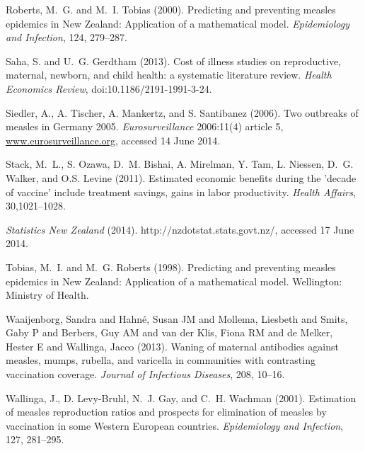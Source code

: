 \documentclass{article}
\begin{document}
\begin{thebibliography}{}
Roberts, M.~G. and M.~I. Tobias (2000).
\newblock Predicting and preventing measles epidemics in New Zealand: Application of a mathematical model. 
\newblock \emph{Epidemiology and Infection}, 124, 279--287.

Saha, S. and U.~G. Gerdtham (2013).
\newblock Cost of illness studies on reproductive, maternal, newborn, and child health: a systematic literature review.
\newblock \emph{Health Economics Review}, doi:10.1186/2191-1991-3-24.

Siedler, A., A. Tischer, A. Mankertz, and S. Santibanez (2006).
\newblock Two outbreaks of measles in Germany 2005.
\newblock \emph{Eurosurveillance} 2006:11(4) article 5, \href{http://www.eurosurveillance.org/ViewArticle.aspx?ArticleId=615}{www.eurosurveillance.org}, accessed 14 June 2014.

Stack, M.~L., S. Ozawa, D.~M. Bishai, A. Mirelman, Y. Tam, L. Niessen, D.~G. Walker, and O.S. Levine (2011).
\newblock Estimated economic benefits during the 'decade of vaccine' include treatment savings, gains in labor productivity.
\newblock \emph{Health Affairs}, 30,1021--1028.

\newblock \emph{Statistics New Zealand} (2014).
http://nzdotstat.stats.govt.nz/, accessed 17 June 2014.

Tobias, M.~I. and M.~G. Roberts (1998).
\newblock Predicting and preventing measles epidemics in New Zealand: Application of a mathematical model.
\newblock Wellington: Ministry of Health.

Waaijenborg, Sandra and Hahn{\'e}, Susan JM and Mollema, Liesbeth and Smits, Gaby P and Berbers, Guy AM and van der Klis, Fiona RM and de Melker, Hester E and Wallinga, Jacco (2013).
\newblock Waning of maternal antibodies against measles, mumps, rubella, and varicella in communities with contrasting vaccination coverage.
\newblock \emph{Journal of Infectious Diseases}, 208, 10--16.

Wallinga, J., D. Levy-Bruhl, N.~J. Gay, and C.~H. Wachman (2001).
\newblock Estimation of measles reproduction ratios and prospects for elimination of measles by vaccination in some Western European countries.
\newblock \emph{Epidemiology and Infection}, 127, 281--295.


\end{thebibliography}
\end{document}
